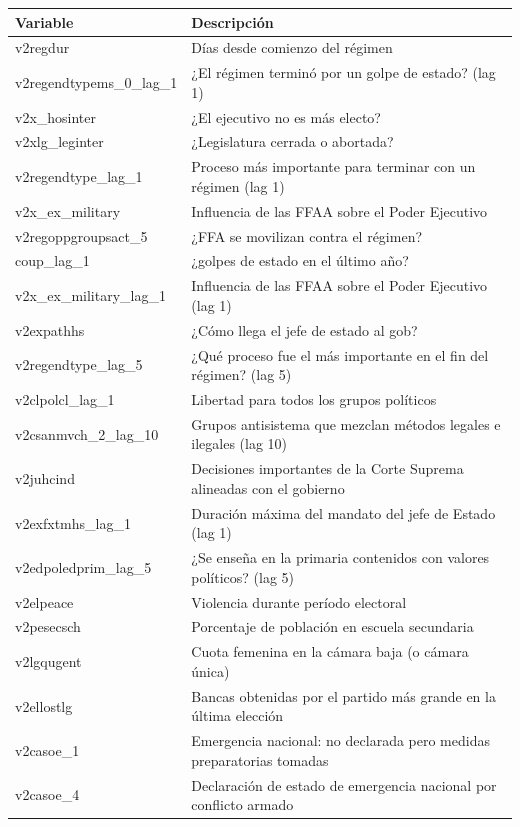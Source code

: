 \documentclass{article}
\begin{document}
\begin{table}[H]
 \begin{tabular}{ll}
  \toprule
  Variable & Descripción \\
  \midrule
  v2regdur & Días desde comienzo del régimen \\
  v2regendtypems\_0\_lag\_1 & ¿El régimen terminó por un golpe de estado? (lag 1) \\
  v2x\_hosinter & ¿El ejecutivo no es más electo? \\
  v2xlg\_leginter & ¿Legislatura cerrada o abortada? \\
  v2regendtype\_lag\_1 & Proceso más importante para terminar con un régimen (lag 1) \\
  v2x\_ex\_military & Influencia de las FFAA sobre el Poder Ejecutivo \\
  v2regoppgroupsact\_5 & ¿FFA se movilizan contra el régimen? \\
  coup\_lag\_1 & ¿golpes de estado en el último año? \\
  v2x\_ex\_military\_lag\_1 & Influencia de las FFAA sobre el Poder Ejecutivo (lag 1) \\
  v2expathhs & ¿Cómo llega el jefe de estado al gob? \\
  v2regendtype\_lag\_5 & ¿Qué proceso fue el más importante en el fin del régimen? (lag 5) \\
  v2clpolcl\_lag\_1 & Libertad para todos los grupos políticos \\
  v2csanmvch\_2\_lag\_10 & Grupos antisistema que mezclan métodos legales e ilegales (lag 10) \\
  v2juhcind & Decisiones importantes de la Corte Suprema alineadas con el gobierno \\
  v2exfxtmhs\_lag\_1 & Duración máxima del mandato del jefe de Estado (lag 1) \\
  v2edpoledprim\_lag\_5 & ¿Se enseña en la primaria contenidos con valores políticos? (lag 5) \\
  v2elpeace & Violencia durante período electoral \\
  v2pesecsch & Porcentaje de población en escuela secundaria \\
  v2lgqugent & Cuota femenina en la cámara baja (o cámara única) \\
  v2ellostlg & Bancas obtenidas por el partido más grande en la última elección \\
  v2casoe\_1 & Emergencia nacional: no declarada pero medidas preparatorias tomadas \\
  v2casoe\_4 & Declaración de estado de emergencia nacional por conflicto armado \\

\end{tabular}
\end{table}
\end{document}
